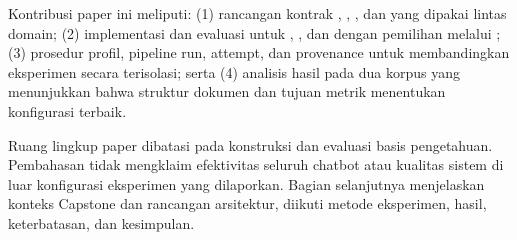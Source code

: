 Kontribusi paper ini meliputi: (1) rancangan kontrak , , , dan  yang dipakai lintas domain; (2) implementasi dan evaluasi \plugin{} untuk \chunker, \indexer, dan \kg{} dengan pemilihan melalui \profile{}; (3) prosedur profil, pipeline run, attempt, dan provenance untuk membandingkan eksperimen secara terisolasi; serta (4) analisis hasil pada dua korpus yang menunjukkan bahwa struktur dokumen dan tujuan metrik menentukan konfigurasi terbaik.

Ruang lingkup paper dibatasi pada konstruksi dan evaluasi basis pengetahuan. Pembahasan tidak mengklaim efektivitas seluruh chatbot atau kualitas sistem di luar konfigurasi eksperimen yang dilaporkan. Bagian selanjutnya menjelaskan konteks Capstone dan rancangan arsitektur, diikuti metode eksperimen, hasil, keterbatasan, dan kesimpulan.

